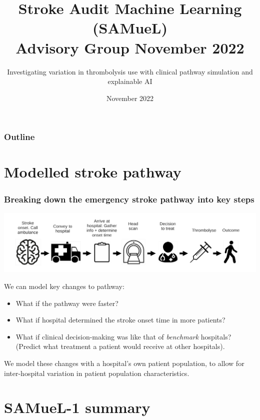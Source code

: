\documentclass[xcolor={usenames,dvipsnames}]{beamer}
\title{Stroke Audit Machine Learning (SAMueL) \\ Advisory Group November 2022}
\subtitle{Investigating variation in thrombolysis use with clinical pathway simulation and explainable AI}
\date{November 2022}
\begin{document}

\begin{frame}
\titlepage

\end{frame}



\begin{frame}
\frametitle{Outline}
\tableofcontents
\end{frame}

\section{Modelled stroke pathway}


\begin{frame}
\frametitle{Breaking down the emergency stroke pathway into key steps}
\begin{center}
\includegraphics[width=1.0\textwidth]{./images/pathway}
\end{center}
We can model key changes to pathway:
\begin{small}
\begin{itemize}
    \item What if the pathway were faster?
    \item What if hospital determined the stroke onset time in more patients?
    \item What if clinical decision-making was like that of \emph{benchmark} hospitals? (Predict what treatment a patient would receive at other hospitals).
\end{itemize}
\end{small}
\footnotesize{We model these changes with a hospital's own patient population, to allow for inter-hospital variation in patient population characteristics.}
\end{frame}

\section{SAMueL-1 summary}
\end{document}
